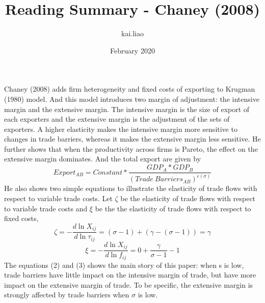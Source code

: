 \documentclass{article}
\title{Reading Summary - Chaney (2008)}
\author{kai.liao }
\date{February 2020}
\begin{document}
\maketitle

Chaney (2008) adds firm heterogeneity and fixed costs of exporting to Krugman (1980) model. And this model introduces two margin of adjustment: the intensive margin and the extensive margin. The intensive margin is the size of export of each exporters and the extensive margin is the adjustment of the sets of exporters. A higher elasticity makes the intensive margin more sensitive to changes in trade barriers, whereas it makes the
extensive margin less sensitive. He further shows that when the productivity across firms is Pareto, the effect on the extensive margin dominates. And the total export are given by
\begin{equation}
    Export_{AB} = Constant * \frac{GDP_A*GDP_B}{(Trade~ Barriers_{AB})^{\epsilon(\sigma)}}
\end{equation}
He also shows two simple equations to illustrate the elasticity of trade flows with respect to variable trade costs. Let $\zeta$ be the elasticity of trade flows with respect to variable trade costs and $\xi$ be the  the elasticity of trade flows with respect to fixed costs,
\begin{equation}
    \zeta = -\frac{d\ln{X_{ij}}}{d\ln{\tau_{ij}}} = (\sigma-1) + (\gamma - (\sigma -1)) = \gamma
\end{equation}
\begin{equation}
    \xi = -\frac{d\ln{X_{ij}}}{d\ln{f_{ij}}} = 0 + \frac{\gamma}{\sigma-1}-1
\end{equation}
The equations (2) and (3) shows the main story of this paper: when s is low, trade barriers have little impact on the intensive margin of trade, but have more impact on the extensive margin of trade. To be specific, the extensive margin is strongly affected by trade barriers when $\sigma$ is low.
\end{document}
